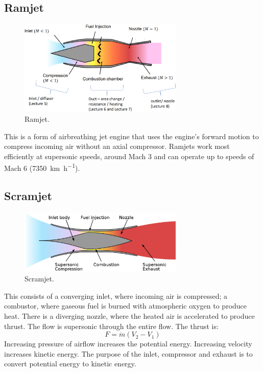 \subsection{Ramjet}
\begin{figure}[H]
    \centering
    \includegraphics[width = 0.7\textwidth]{./img/diagram37.png}
    \caption{Ramjet.}
\end{figure}
This is a form of airbreathing jet engine that uses the engine's forward motion to compress incoming air without an axial compressor. Ramjets work most efficiently at supersonic speeds, around Mach 3 and can operate up to speeds of Mach 6 (\SI{7350}{\kilo\meter\per\hour}).
\subsection{Scramjet}
\begin{figure}[H]
    \centering
    \includegraphics[width = 0.7\textwidth]{./img/diagram44.png}
    \caption{Scramjet.}
\end{figure}
This consists of a converging inlet, where incoming air is compressed; a combustor, where gaseous fuel is burned with atmospheric oxygen to produce heat. There is a diverging nozzle, where the heated air is accelerated to produce thrust. The flow is supersonic through the entire flow. The thrust is:
\begin{equation}
    F = \dot{m}\left(V_2 - V_1\right)
\end{equation}
Increasing pressure of airflow increases the potential energy. Increasing velocity increases kinetic energy. The purpose of the inlet, compressor and exhaust is to convert potential energy to kinetic energy.
